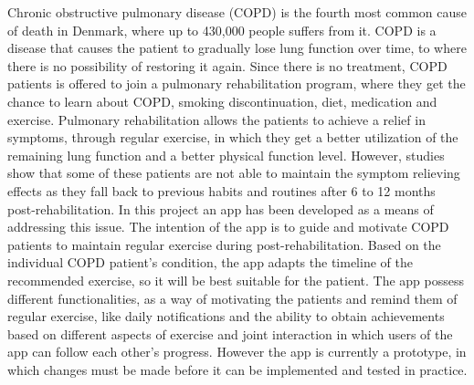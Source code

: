 Chronic obstructive pulmonary disease (COPD) is the fourth most common cause of death in Denmark, where up to 430,000 people suffers from it. 
COPD is a disease that causes the patient to gradually lose lung function over time, to where there is no possibility of restoring it again.
Since there is no treatment, COPD patients is offered to join a pulmonary rehabilitation program, where they get the chance to learn about COPD, smoking discontinuation, diet, medication and exercise. 
Pulmonary rehabilitation allows the patients to achieve a relief in symptoms, through regular exercise, in which they get a better utilization of the remaining lung function and a better physical function level. 
However, studies show that some of these patients are not able to maintain the symptom relieving effects as they fall back to previous habits and routines after 6 to 12 months post-rehabilitation. 
In this project an app has been developed as a means of addressing this issue. The intention of the app is to guide and motivate COPD patients to maintain regular exercise during post-rehabilitation. 
Based on the individual COPD patient's condition, the app adapts the timeline of the recommended exercise, so it will be best suitable for the patient. 
The app possess different functionalities, as a way of motivating the patients and remind them of regular exercise, like daily notifications and the ability to obtain achievements based on different aspects of exercise and joint interaction in which users of the app can follow each other's progress.
However the app is currently a prototype, in which changes must be made before it can be implemented and tested in practice.